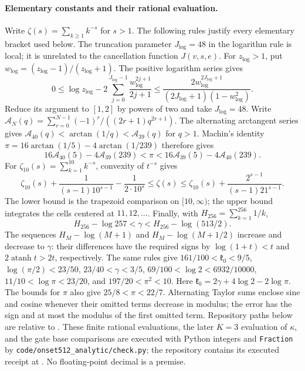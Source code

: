 \paragraph{Elementary constants and their rational evaluation.}
Write $\zeta(s)=\sum_{k\geq1}k^{-s}$ for $s>1$.
The following rules justify every elementary bracket used below.
The truncation parameter $J_{\log}=48$ in the logarithm rule is local;
it is unrelated to the cancellation function $J(v,s,e)$.
For $z_{\log}>1$, put $w_{\log}=(z_{\log}-1)/(z_{\log}+1)$. The positive logarithm series gives
\begin{equation}\label{ul:log-series}
 0\leq\log z_{\log}-2\sum_{j=0}^{J_{\log}-1}\frac{w_{\log}^{2j+1}}{2j+1}
 \leq\frac{2w_{\log}^{2J_{\log}+1}}{(2J_{\log}+1)(1-w_{\log}^2)}.
\end{equation}
Reduce its argument to $[1,2]$ by powers of two and take $J_{\log}=48$.
Write $\mathcal A_N(q)=\sum_{r=0}^{N-1}(-1)^r/((2r+1)q^{2r+1})$.
The alternating arctangent series gives
$\mathcal A_{40}(q)<\arctan(1/q)<\mathcal A_{39}(q)$ for $q>1$.
Machin's identity $\pi=16\arctan(1/5)-4\arctan(1/239)$ therefore gives
\[
 16\mathcal A_{40}(5)-4\mathcal A_{39}(239)<\pi
 <16\mathcal A_{39}(5)-4\mathcal A_{40}(239).
\]
For $\zeta_{10}(s)=\sum_{k=1}^{10}k^{-s}$, convexity of $t^{-s}$ gives
\[
 \zeta_{10}(s)+\frac1{(s-1)10^{s-1}}-\frac1{2\cdot10^s}
 \leq\zeta(s)\leq \zeta_{10}(s)+\frac{2^{s-1}}{(s-1)21^{s-1}}.
\]
The lower bound is the trapezoid comparison on $[10,\infty)$;
the upper bound integrates the cells centered at $11,12,\ldots$.
Finally, with $H_{256}=\sum_{k=1}^{256}1/k$,
\[
 H_{256}-\log257<\gamma<H_{256}-\log(513/2).
\]
The sequences $H_M-\log(M+1)$ and $H_M-\log(M+1/2)$ increase and
decrease to $\gamma$: their differences have the required signs by
$\log(1+t)<t$ and $2\operatorname{atanh}t>2t$, respectively.
The same rules give
$161/100<\mathfrak k_0<9/5$, $\log(\pi/2)<23/50$,
$23/40<\gamma<3/5$, $69/100<\log2<6932/10000$,
$11/10<\log\pi<23/20$, and $197/20<\pi^2<10$.
Here $\mathfrak k_0=2\gamma+4\log2-2\log\pi$.
The bounds for $\pi$ also give $25/8<\pi<22/7$.
Alternating Taylor sums enclose sine and cosine whenever their omitted
terms decrease in modulus; the error has the sign and at most the
modulus of the first omitted term.
Repository paths below are relative to
.
These finite rational evaluations, the later $K=3$ evaluation of
$\kappa$, and the gate base comparisons are executed with Python
integers and \texttt{Fraction} by
\texttt{code/onset512\_analytic/check.py}; the repository contains its
executed receipt at . No floating-point decimal is a premise.

